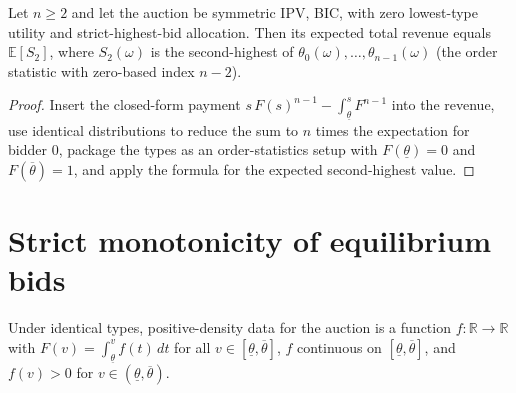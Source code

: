 \begin{theorem}\label{thm:MathEconLib.Auction.total_revenue}\leanok
{}
Let $n\ge2$ and let the auction be symmetric IPV, BIC, with zero lowest-type utility and strict-highest-bid allocation. Then its expected total revenue equals $\mathbb{E}[S_2]$, where $S_2(\omega)$ is the second-highest of $\theta_0(\omega),\dots,\theta_{n-1}(\omega)$ (the order statistic with zero-based index $n-2$).
\end{theorem}
\begin{proof}\leanok
{}
Insert the closed-form payment $s\,F(s)^{n-1}-\int_{\underline\theta}^{s}F^{n-1}$ into the revenue, use identical distributions to reduce the sum to $n$ times the expectation for bidder $0$, package the types as an order-statistics setup with $F(\underline\theta)=0$ and $F(\overline\theta)=1$, and apply the formula for the expected second-highest value.
\end{proof}

\section{Strict monotonicity of equilibrium bids}

\begin{definition}\label{def:MathEconLib.Auction.HasPosDensity}\leanok
{}
Under identical types, positive-density data for the auction is a function $f:\mathbb{R}\to\mathbb{R}$ with $F(v)=\int_{\underline\theta}^{v}f(t)\,dt$ for all $v\in[\underline\theta,\overline\theta]$, $f$ continuous on $[\underline\theta,\overline\theta]$, and $f(v)>0$ for $v\in(\underline\theta,\overline\theta)$.
\end{definition}

